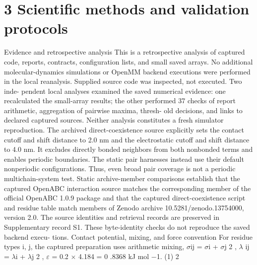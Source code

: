 \documentclass[11pt]{article}
\begin{document}
\section*{3 Scientific methods and validation protocols}

Evidence and retrospective analysis
This is a retrospective analysis of captured code, reports, contracts, configuration lists, and small
saved arrays. No additional molecular-dynamics simulations or OpenMM backend executions were
performed in the local reanalysis. Supplied source code was inspected, not executed. Two inde-
pendent local analyses examined the saved numerical evidence: one recalculated the small-array
results; the other performed 37 checks of report arithmetic, aggregation of pairwise maxima, thresh-
old decisions, and links to declared captured sources. Neither analysis constitutes a fresh simulator
reproduction.
The archived direct-coexistence source explicitly sets the contact cutoff and shift distance to 2.0
nm and the electrostatic cutoff and shift distance to 4.0 nm. It excludes directly bonded neighbors
from both nonbonded terms and enables periodic boundaries. The static pair harnesses instead
use their default nonperiodic configurations. Thus, even broad pair coverage is not a periodic
multichain-system test. Static archive-member comparisons establish that the captured OpenABC
interaction source matches the corresponding member of the official OpenABC 1.0.9 package and
that the captured direct-coexistence script and residue table match members of Zenodo archive
10.5281/zenodo.13754000, version 2.0. The source identities and retrieval records are preserved in
Supplementary record S1. These byte-identity checks do not reproduce the saved backend execu-
tions.
Contact potential, mixing, and force convention
For residue types i, j, the captured preparation uses arithmetic mixing,
\ensuremath{\sigma}ij = \ensuremath{\sigma}i + \ensuremath{\sigma}j
2 , \ensuremath{\lambda} ij = \ensuremath{\lambda}i + \ensuremath{\lambda}j
2 , \ensuremath{\varepsilon} = 0.2 \ensuremath{\times} 4.184 = 0 .8368 kJ mol \ensuremath{-}1. (1)
2
\end{document}
